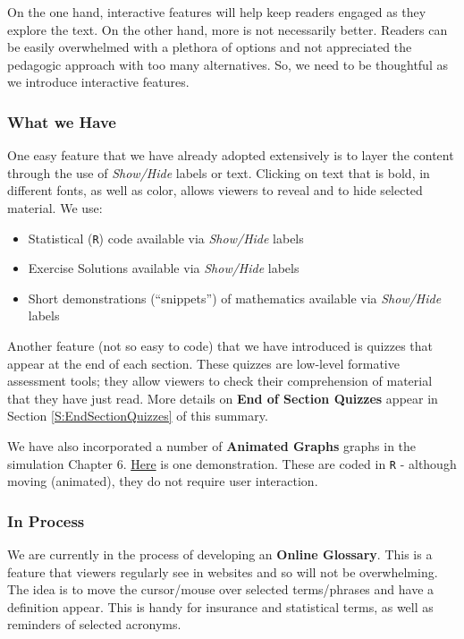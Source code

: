 \documentclass[]{article}
\providecommand{\tightlist}{%
  \setlength{\itemsep}{0pt}\setlength{\parskip}{0pt}}
\begin{document}
On the one hand, interactive features will help keep readers engaged as
they explore the text. On the other hand, more is not necessarily
better. Readers can be easily overwhelmed with a plethora of options and
not appreciated the pedagogic approach with too many alternatives. So,
we need to be thoughtful as we introduce interactive features.

\subsubsection{What we Have}\label{what-we-have}

One easy feature that we have already adopted extensively is to layer
the content through the use of \emph{Show/Hide} labels or text. Clicking
on text that is bold, in different fonts, as well as color, allows
viewers to reveal and to hide selected material. We use:

\begin{itemize}
\tightlist
\item
  Statistical (\texttt{R}) code available via \emph{Show/Hide} labels
\item
  Exercise Solutions available via \emph{Show/Hide} labels
\item
  Short demonstrations (``snippets'') of mathematics available via
  \emph{Show/Hide} labels
\end{itemize}

Another feature (not so easy to code) that we have introduced is quizzes
that appear at the end of each section. These quizzes are low-level
formative assessment tools; they allow viewers to check their
comprehension of material that they have just read. More details on
\textbf{End of Section Quizzes} appear in Section
\ref{S:EndSectionQuizzes} of this summary.

We have also incorporated a number of \textbf{Animated Graphs} graphs in
the simulation Chapter 6.
\href{https://openacttexts.github.io/Loss-Data-Analytics/C-Simulation.html\#S:ImportanceSampling}{Here}
is one demonstration. These are coded in \texttt{R} - although moving
(animated), they do not require user interaction.

\subsubsection{In Process}\label{in-process}

We are currently in the process of developing an \textbf{Online
Glossary}. This is a feature that viewers regularly see in websites and
so will not be overwhelming. The idea is to move the cursor/mouse over
selected terms/phrases and have a definition appear. This is handy for
insurance and statistical terms, as well as reminders of selected
acronyms.
\end{document}
